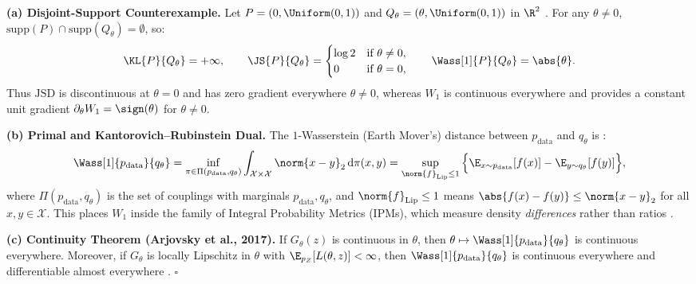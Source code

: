 \documentclass[../../../../master.tex]{subfiles}
\begin{document}
\begin{coremath}
\textbf{(a) Disjoint-Support Counterexample.} Let $P = (0, \Uniform(0,1))$ and $Q_\theta = (\theta, \Uniform(0,1))$ in $\R^2$ . For any $\theta \neq 0$, $\mathrm{supp}(P) \cap \mathrm{supp}(Q_\theta) = \emptyset$, so:
\begin{equation}
  \label{eq:gan:disjoint_counterexample}
  \KL{P}{Q_\theta} = +\infty, \qquad
  \JS{P}{Q_\theta} = \begin{cases} \log 2 & \text{if } \theta \neq 0, \\ 0 & \text{if } \theta = 0, \end{cases}
  \qquad
  \Wass[1]{P}{Q_\theta} = \abs{\theta}.
\end{equation}
Thus $\mathrm{JSD}$ is discontinuous at $\theta = 0$ and has zero gradient everywhere $\theta \neq 0$, whereas $W_1$ is continuous everywhere and provides a constant unit gradient $\partial_\theta W_1 = \sign(\theta)$ for $\theta \neq 0$.

\textbf{(b) Primal and Kantorovich--Rubinstein Dual.} The $1$-Wasserstein (Earth Mover's) distance between $p_{\mathrm{data}}$ and $q_\theta$ is  :
\begin{equation}
  \label{eq:gan:w1_primal_dual}
  \Wass[1]{p_{\mathrm{data}}}{q_\theta}
  = \inf_{\pi \in \Pi(p_{\mathrm{data}}, q_\theta)} \int_{\mathcal{X}\times\mathcal{X}} \norm{x - y}_2\,\mathrm{d}\pi(x, y)
  = \sup_{\norm{f}_{\mathrm{Lip}} \le 1} \Big\{ \E_{x \sim p_{\mathrm{data}}}[f(x)] - \E_{y \sim q_\theta}[f(y)] \Big\},
\end{equation}
where $\Pi(p_{\mathrm{data}}, q_\theta)$ is the set of couplings with marginals $p_{\mathrm{data}}, q_\theta$, and $\norm{f}_{\mathrm{Lip}} \le 1$ means $\abs{f(x) - f(y)} \le \norm{x - y}_2$ for all $x, y \in \mathcal{X}$. This places $W_1$ inside the family of Integral Probability Metrics (IPMs), which measure density \emph{differences} rather than ratios .

\textbf{(c) Continuity Theorem (Arjovsky et al., 2017).} If $G_\theta(z)$ is continuous in $\theta$, then $\theta \mapsto \Wass[1]{p_{\mathrm{data}}}{q_\theta}$ is continuous everywhere. Moreover, if $G_\theta$ is locally Lipschitz in $\theta$ with $\E_{p_Z}[L(\theta, z)] < \infty$, then $\Wass[1]{p_{\mathrm{data}}}{q_\theta}$ is continuous everywhere and differentiable almost everywhere . \hfill $\square$
\end{coremath}
\end{document}
